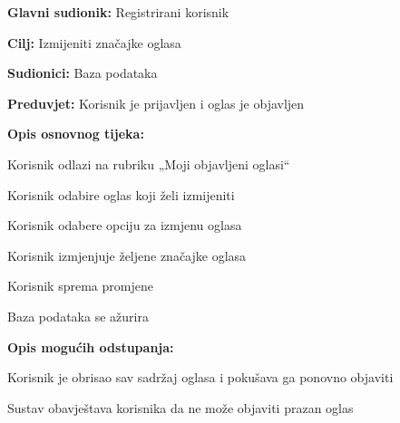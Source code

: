 					\noindent {}
					\begin{packed_item}
						
						\item \textbf{Glavni sudionik: }Registrirani korisnik
						\item  \textbf{Cilj:} Izmijeniti značajke oglasa   
						\item  \textbf{Sudionici:} Baza podataka
						\item  \textbf{Preduvjet:} Korisnik je prijavljen i oglas je objavljen
						\item  \textbf{Opis osnovnog tijeka:}
						
						\item[] \begin{packed_enum}
							\item Korisnik odlazi na rubriku „Moji objavljeni oglasi“
							\item Korisnik odabire oglas koji želi izmijeniti
							\item Korisnik odabere opciju za izmjenu oglasa
							\item Korisnik izmjenjuje željene značajke oglasa
							\item Korisnik sprema promjene
							\item Baza podataka se ažurira
						\end{packed_enum}
						
						\item  \textbf{Opis mogućih odstupanja:}
						
						\item[] \begin{packed_item}
							
							\item[4.a] Korisnik je obrisao sav sadržaj oglasa i pokušava ga ponovno objaviti 
							\item[] \begin{packed_enum}
								\item Sustav obavještava korisnika da ne može objaviti prazan oglas
							\end{packed_enum}
							
						\end{packed_item}
					\end{packed_item}
					
